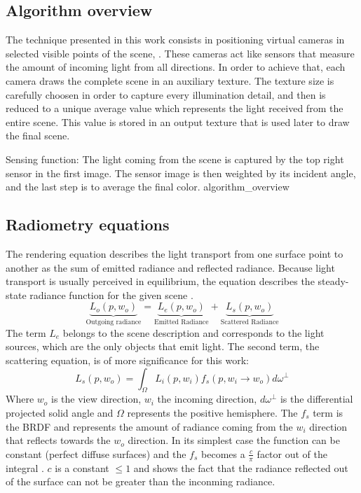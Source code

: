 \documentclass[10pt, conference]{IEEEtran}
\begin{document}
\subsection{Algorithm overview}
%
The technique presented in this work consists in positioning virtual cameras in selected visible points of the scene, .
These cameras act like sensors that measure the amount of incoming light from all directions. 
In order to achieve that, each camera draws the complete scene in an auxiliary texture. 
The texture size is carefully choosen in order to capture every illumination detail,
 and then is reduced to a unique average value which represents the light received 
from the entire scene. 
This value is stored in an output texture that is used later to draw the final scene. 

\subimages
	{Sensing function: The light coming from the scene is captured by the top right sensor in the first image. 
	The sensor image is then weighted by its incident angle, and the last step is to average the final color.}
	{algorithm_overview}{
}

\subsection{Radiometry equations}
%
The rendering equation \cite{The_rendering_equation} describes the light transport from one surface point to another as the sum of emitted radiance and reflected radiance. Because light transport is usually perceived in equilibrium, the equation describes the steady-state radiance function for the given scene \cite{The_rendering_equation}.
\[
	\underbrace{L_o(p,w_o)}_\text{Outgoing radiance} = \underbrace{L_e(p,w_o)}_\text{Emitted Radiance} + \underbrace{L_s(p,w_o)}_\text{Scattered Radiance}
\]
The term $L_e$ belongs to the scene description and corresponds to the light sources, which are the only objects that emit light. The second term, the scattering equation, is of more significance for this work: 
\[
	L_s(p,w_o) = \int_ \Omega L_i(p,w_i)f_s(p,w_i\rightarrow w_o)d\omega^\perp
\]
Where $w_o$ is the view direction, $w_i$ the incoming direction, $d\omega^\perp$ is the differential projected solid angle and
$\Omega$ represents the positive hemisphere. 
The $f_s$ term is the BRDF \cite{brdf} and represents the amount of radiance coming from the $w_i$ direction that reflects towards the $w_o$ direction. 
In its simplest case the function can be constant (perfect diffuse surfaces) and the $f_s$ becomes a $\frac{c}{\pi}$ factor out of the integral \cite[p.~78]{monte_carlo_light_transport}.
$c$ is a constant $\leq 1$ and shows the fact that the radiance reflected out of the surface can not be greater than the inconming radiance.\
\end{document}
